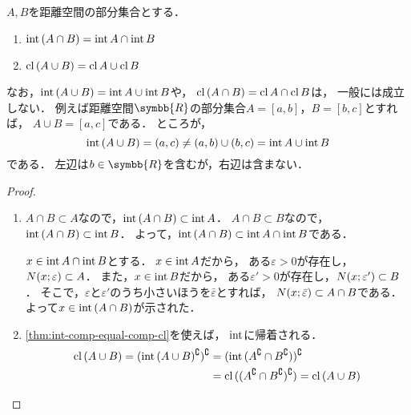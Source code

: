 \documentclass[../sotsu.tex]{subfiles}
\begin{document}
\begin{proposition}
    \label{thm:int-of-intersection-and-cl-of-union}
    $A, B$を距離空間の部分集合とする．
    \begin{enumerate}
        \item $\operatorname{int}{(A \cap B)} = \operatorname{int}{A} \cap \operatorname{int}{B}$
        \item $\operatorname{cl}{(A \cup B)} = \operatorname{cl}{A} \cup \operatorname{cl}{B}$
    \end{enumerate}
\end{proposition}

なお，$\operatorname{int}{(A \cup B)} = \operatorname{int}{A} \cup \operatorname{int}{B}$や，
$\operatorname{cl}{(A \cap B)} = \operatorname{cl}{A} \cap \operatorname{cl}{B}$は，
一般には成立しない．
例えば距離空間$\symbb{R}$の部分集合$A = [a, b]$，$B = [b, c]$とすれば，
$A \cup B = [a, c]$である．
ところが，
\[  \operatorname{int}{(A \cup B)} = (a, c)
    \neq
    (a, b) \cup (b, c) 
    = \operatorname{int}{A} \cup \operatorname{int}{B}  \]
である．
左辺は$b \in \symbb{R}$を含むが，右辺は含まない．

\begin{proof}
    \begin{enumerate}
        \item 
            \quad
            $A \cap B \subset A$なので，$\operatorname{int}{(A \cap B)} \subset \operatorname{int}{A}$．
            $A \cap B \subset B$なので，$\operatorname{int}{(A \cap B)} \subset \operatorname{int}{B}$．
            よって，$\operatorname{int}{(A \cap B)} \subset \operatorname{int}{A} \cap \operatorname{int}{B}$である．

            \quad
            $x \in \operatorname{int}{A} \cap \operatorname{int}{B}$とする．
            $x \in \operatorname{int}{A}$だから，
            ある$\varepsilon > 0$が存在し，$N(x; \varepsilon) \subset A$．
            また，$x \in \operatorname{int}{B}$だから，
            ある$\varepsilon' > 0$が存在し，$N(x; \varepsilon') \subset B$．
            そこで，$\varepsilon$と$\varepsilon'$のうち小さいほうを$\bar{\varepsilon}$とすれば，
            $N(x; \bar{\varepsilon}) \subset A \cap B$である．
            よって$x \in \operatorname{int}{(A \cap B)}$が示された．
        \item 
            \cref{thm:int-comp-equal-comp-cl}を使えば，
            $\operatorname{int}$に帰着される．
            \begin{equation*}
                \begin{split}
                    \operatorname{cl}{(A \cup B)}
                    = ( \operatorname{int}{(A \cup B)^\complement} )^\complement
                    &= ( \operatorname{int}{( A^\complement \cap B^\complement )} )^\complement
                    \\
                    &= \operatorname{cl}{ ( ( A^\complement \cap B^\complement )^\complement ) }
                    = \operatorname{cl}{ ( A \cup B ) }
                \qedhere
                \end{split}
            \end{equation*}
    \end{enumerate}
\end{proof}
\end{document}
